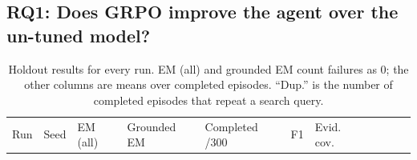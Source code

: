 \subsection{RQ1: Does GRPO improve the agent over the un-tuned
model?}\label{sec:4.3}

\begin{longtable}[]{@{}
  >{\raggedright\arraybackslash}p{}
  >{\raggedright\arraybackslash}p{}
  >{\raggedright\arraybackslash}p{}
  >{\raggedright\arraybackslash}p{}
  >{\raggedright\arraybackslash}p{}
  >{\raggedright\arraybackslash}p{}
  >{\raggedright\arraybackslash}p{}
  >{\raggedright\arraybackslash}p{}
  >{\raggedright\arraybackslash}p{}
  >{\raggedright\arraybackslash}p{}
  >{\raggedright\arraybackslash}p{}@{}}
\caption{Holdout results for every run. EM (all) and grounded EM count
failures as 0; the other columns are means over completed episodes.
``Dup.'' is the number of completed episodes that repeat a search
query.}\label{tbl:4.1}\tabularnewline
\toprule\noalign{}
\begin{minipage}[b]{\linewidth}\raggedright
Run
\end{minipage} & \begin{minipage}[b]{\linewidth}\raggedright
Seed
\end{minipage} & \begin{minipage}[b]{\linewidth}\raggedright
EM (all)
\end{minipage} & \begin{minipage}[b]{\linewidth}\raggedright
Grounded EM
\end{minipage} & \begin{minipage}[b]{\linewidth}\raggedright
Completed /300
\end{minipage} & \begin{minipage}[b]{\linewidth}\raggedright
F1
\end{minipage} & \begin{minipage}[b]{\linewidth}\raggedright
Evid. cov.
\end{minipage} & \begin{minipage}[b]{\linewidth}\raggedright

\end{minipage}
\end{longtable}
